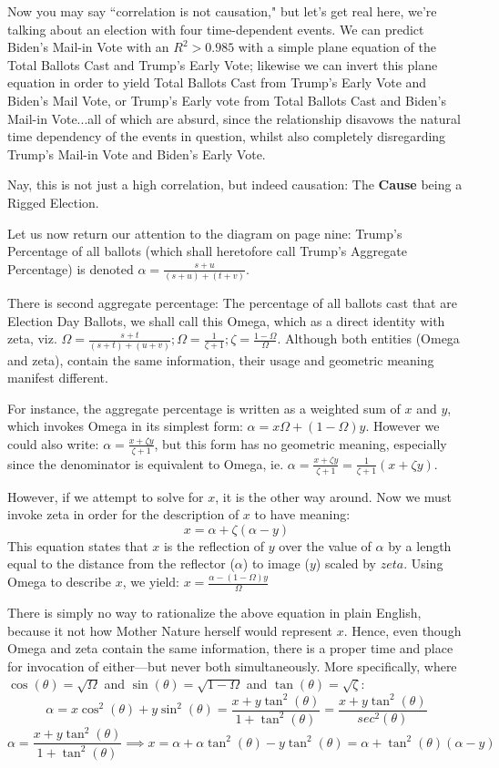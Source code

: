 \documentclass[preprint,13pt]{elsarticle}
\begin{document}
Now you may say ``correlation is not causation," but let's get real here, we're talking about an election with four time-dependent events. We can predict Biden's Mail-in Vote with an $R^2>0.985$ with a simple plane equation of the Total Ballots Cast and Trump's Early Vote; likewise we can invert this plane equation in order to yield Total Ballots Cast from Trump's Early Vote and Biden's Mail Vote, or Trump's Early vote from Total Ballots Cast and Biden's Mail-in Vote...all of which are absurd, since the relationship disavows the natural time dependency of the events in question, whilst also completely disregarding Trump's Mail-in Vote and Biden's Early Vote.

Nay, this is not just a high correlation, but indeed causation: The \textbf{Cause} being a Rigged Election.

Let us now return our attention to the diagram on page nine: Trump's Percentage of all ballots (which shall heretofore call Trump's Aggregate Percentage) is denoted $\alpha=\frac{s+u}{(s+u)+(t+v)}$. 

There is second aggregate percentage: The percentage of all ballots cast that are Election Day Ballots, we shall call this Omega, which as a direct identity with zeta, viz. $\Omega=\frac{s+t}{(s+t)+(u+v)}; \Omega=\frac{1}{\zeta+1}; \zeta=\frac{1-\Omega}{\Omega}$. Although both entities (Omega and zeta), contain the same information, their usage and geometric meaning manifest different.

For instance, the aggregate percentage is written as a weighted sum of $x$ and $y$, which invokes Omega in its simplest form: $\alpha=x\Omega+(1-\Omega)y$. However we could also write: $\alpha=\frac{x+\zeta y}{\zeta+1}$, but this form has no geometric meaning, especially since the denominator is equivalent to Omega, ie. $\alpha=\frac{x+\zeta y}{\zeta+1}=\frac{1}{\zeta+1}(x+\zeta y)$.

However, if we attempt to solve for $x$, it is the other way around. Now we must invoke zeta in order for the description of $x$ to have meaning: $$x=\alpha+\zeta(\alpha-y)$$
This equation states that $x$ is the reflection of $y$ over the value of $\alpha$ by a length equal to the distance from the reflector ($\alpha$) to image ($y$) scaled by $zeta$.
\newpage
Using Omega to describe $x$, we yield:
$x=\frac{\alpha-(1-\Omega)y}{\Omega}$

There is simply no way to rationalize the above equation in plain English, because it not how Mother Nature herself would represent $x$. Hence, even though Omega and zeta contain the same information, there is a proper time and place for invocation of either---but never both simultaneously. More specifically, where $\cos(\theta)=\sqrt{\Omega}$ and $\sin(\theta)=\sqrt{1-\Omega}$ and $\tan(\theta)=\sqrt{\zeta}$:
$$\alpha=x\cos^2(\theta)+y\sin^2(\theta)=\frac{x+y\tan^2(\theta)}{1+\tan^2(\theta)}=\frac{x+y\tan^2(\theta)}{sec^2(\theta)}$$ 
$$\alpha=\frac{x+y\tan^2(\theta)}{1+\tan^2(\theta)} \implies x=\alpha+\alpha\tan^2(\theta)-y\tan^2(\theta)=\alpha+\tan^2(\theta)(\alpha-y)$$
\end{document}
